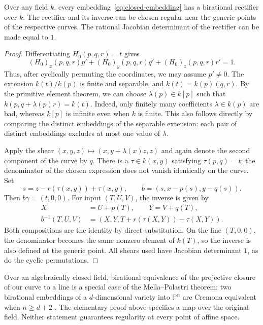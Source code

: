 \begin{proposition}\label{prop:birational-any-field}
Over any field $k$, every embedding~\eqref{eq:closed-embedding}
has a birational rectifier over $k$. The rectifier and its inverse
can be chosen regular near the generic points of the respective
curves. The rational Jacobian determinant of the rectifier can be
made equal to $1$.
\end{proposition}
\begin{proof}
Differentiating $H_0(p,q,r)=t$ gives
\[
 (H_0)_x(p,q,r)p'+(H_0)_y(p,q,r)q'+(H_0)_z(p,q,r)r'=1.
\]
Thus, after cyclically permuting the coordinates, we may assume
$p'\ne0$. The extension $k(t)/k(p)$ is finite and separable, and
$k(t)=k(p)(q,r)$. By the primitive element theorem, we can choose
$\lambda(p)\in k[p]$ such that
$k(p,q+\lambda(p)r)=k(t)$. Indeed, only finitely many coefficients
$\lambda\in k(p)$ are bad, whereas $k[p]$ is infinite even when
$k$ is finite. This also follows directly by comparing the
distinct embeddings of the separable extension: each pair of
distinct embeddings excludes at most one value of $\lambda$.

Apply the shear $(x,y,z)\mapsto(x,y+\lambda(x)z,z)$ and again
denote the second component of the curve by $q$. There is a
$\tau\in k(x,y)$ satisfying $\tau(p,q)=t$; the denominator of the
chosen expression does not vanish identically on the curve. Set
\begin{equation}\label{eq:birational-construction}
 s=z-r(\tau(x,y))+\tau(x,y),\qquad
 b=(s,x-p(s),y-q(s)).
\end{equation}
Then $b\gamma=(t,0,0)$. For input $(T,U,V)$, the inverse is given by
\begin{equation}\label{eq:birational-inverse}
 \begin{split}
 X&=U+p(T),\qquad Y=V+q(T),\\
 b^{-1}(T,U,V)&=(X,Y,T+r(\tau(X,Y))-\tau(X,Y)).
 \end{split}
\end{equation}
Both compositions are the identity by direct substitution.
On the line $(T,0,0)$, the denominator becomes the same nonzero
element of $k(T)$, so the inverse is also defined at the generic
point. All shears used have Jacobian determinant $1$, as do the
cyclic permutations.
\end{proof}

Over an algebraically closed field, birational equivalence of the
projective closure of our curve to a line is a special case of the
Mella--Polastri theorem: two birational embeddings of a
$d$-dimensional variety into $\mathbb P^n$ are Cremona equivalent
when $n\geq d+2$ \cite[Theorem~1]{MP2009}. The elementary proof
above specifies a map over the original field. Neither statement
guarantees regularity at every point of affine space.

